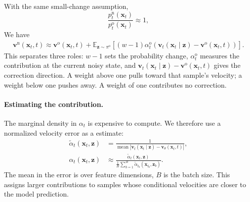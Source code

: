 \documentclass{article} %
\begin{document}
With the same small-change assumption,
\begin{equation}
\frac{p_t^{\mathrm{n}}(\mathbf x_t)}{p_t^{\mathrm{o}}(\mathbf x_t)}
\approx1,
\label{eq:small-marginal-change}
\end{equation}
We have
\begin{equation}
\begin{aligned}
\mathbf v^{\mathrm{n}}(\mathbf x_t,t)
\approx\mathbf v^{\mathrm{o}}(\mathbf x_t,t)
+\mathbb E_{\mathbf z\sim\pi^{\mathrm{o}}}
 [(w-1)\alpha_t^{\mathrm{o}}(\mathbf v_t(\mathbf x_t\mid\mathbf z)-\mathbf v^{\mathrm{o}}(\mathbf x_t,t))].
\end{aligned}
\label{eq:residual-increment}
\end{equation}
This separates three roles: $w-1$ sets the probability change,
$\alpha_t^{\mathrm{o}}$ measures the contribution at the current noisy state,
and $\mathbf v_t(\mathbf x_t\mid\mathbf z)-\mathbf v^{\mathrm{o}}(\mathbf x_t,t)$ gives the correction direction.
A weight above one pulls toward that sample's velocity; a weight below one
pushes away. A weight of one contributes no correction.



\paragraph{Estimating the contribution.}
The marginal density in $\alpha_t$ is expensive to compute. We therefore
use a normalized velocity error as a estimate:
\begin{equation}
\begin{aligned}
\widetilde\alpha_t(\mathbf x_t,\mathbf z)
&=\frac{1}{\operatorname{mean}
 |\mathbf v_t(\mathbf x_t\mid\mathbf z)-\mathbf v_\theta(\mathbf x_t,t)|},\\
\alpha_t(\mathbf x_t,\mathbf z)
&\approx\frac{\widetilde\alpha_t(\mathbf x_t,\mathbf z)}
{\frac1B\sum_{b=1}^{B}
 \widetilde\alpha_{t_b}(\mathbf x_{t_b},\mathbf z_b)}.
\end{aligned}
\label{eq:alpha-estimate}
\end{equation}
The mean in the error is over feature dimensions, $B$ is the batch size. This assigns larger
contributions to samples whose conditional velocities are closer to the
model prediction.
\end{document}
